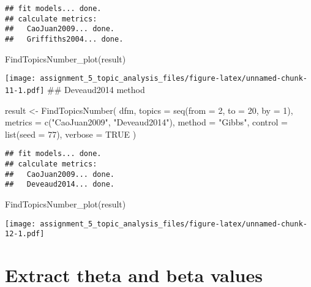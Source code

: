 \documentclass[
]{article}
\newenvironment{Shaded}{\begin{snugshade}}{\end{snugshade}}
\newcommand{\AttributeTok}[1]{\textcolor[rgb]{0.77,0.63,0.00}{#1}}
\newcommand{\ConstantTok}[1]{\textcolor[rgb]{0.00,0.00,0.00}{#1}}
\newcommand{\DecValTok}[1]{\textcolor[rgb]{0.00,0.00,0.81}{#1}}
\newcommand{\FunctionTok}[1]{\textcolor[rgb]{0.00,0.00,0.00}{#1}}
\newcommand{\NormalTok}[1]{#1}
\newcommand{\OtherTok}[1]{\textcolor[rgb]{0.56,0.35,0.01}{#1}}
\newcommand{\StringTok}[1]{\textcolor[rgb]{0.31,0.60,0.02}{#1}}
\begin{document}
\begin{verbatim}
## fit models... done.
## calculate metrics:
##   CaoJuan2009... done.
##   Griffiths2004... done.
\end{verbatim}

\begin{Shaded}
\begin{Highlighting}[]
\FunctionTok{FindTopicsNumber\_plot}\NormalTok{(result)}
\end{Highlighting}
\end{Shaded}

\texttt{[image: assignment\_5\_topic\_analysis\_files/figure-latex/unnamed-chunk-11-1.pdf]}
\#\# Deveaud2014 method

\begin{Shaded}
\begin{Highlighting}[]
\NormalTok{result }\OtherTok{\textless{}{-}} \FunctionTok{FindTopicsNumber}\NormalTok{(}
\NormalTok{  dfm,}
  \AttributeTok{topics =} \FunctionTok{seq}\NormalTok{(}\AttributeTok{from =} \DecValTok{2}\NormalTok{, }\AttributeTok{to =} \DecValTok{20}\NormalTok{, }\AttributeTok{by =} \DecValTok{1}\NormalTok{),}
  \AttributeTok{metrics =} \FunctionTok{c}\NormalTok{(}\StringTok{"CaoJuan2009"}\NormalTok{, }\StringTok{"Deveaud2014"}\NormalTok{),}
  \AttributeTok{method =} \StringTok{"Gibbs"}\NormalTok{,}
  \AttributeTok{control =} \FunctionTok{list}\NormalTok{(}\AttributeTok{seed =} \DecValTok{77}\NormalTok{),}
  \AttributeTok{verbose =} \ConstantTok{TRUE}
\NormalTok{)}
\end{Highlighting}
\end{Shaded}

\begin{verbatim}
## fit models... done.
## calculate metrics:
##   CaoJuan2009... done.
##   Deveaud2014... done.
\end{verbatim}

\begin{Shaded}
\begin{Highlighting}[]
\FunctionTok{FindTopicsNumber\_plot}\NormalTok{(result)}
\end{Highlighting}
\end{Shaded}

\texttt{[image: assignment\_5\_topic\_analysis\_files/figure-latex/unnamed-chunk-12-1.pdf]}

\hypertarget{extract-theta-and-beta-values}{%
\section{Extract theta and beta
values}\label{extract-theta-and-beta-values}}
\end{document}
